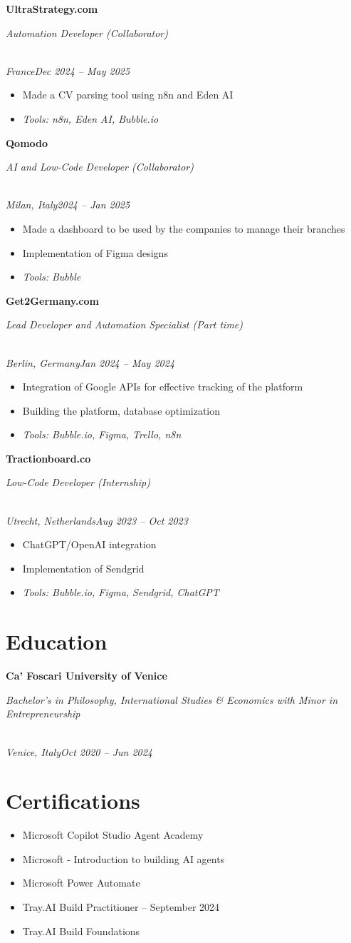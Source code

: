 \documentclass[a4paper,10pt]{article}
\newcommand{\role}[4]{\vspace{3pt}\noindent\hspace{0.6em}\parbox[t]{0.38\textwidth}{\raggedright\textbf{#1}}\hfill\parbox[t]{0.58\textwidth}{\raggedleft\textit{#2}}\\{\textit{#3}\hfill\textit{#4}}\vspace{1pt}}
\begin{document}
\role{UltraStrategy.com}{Automation Developer (Collaborator)}{France}{Dec 2024 -- May 2025}
\begin{itemize}
\item Made a CV parsing tool using n8n and Eden AI
\item \textit{Tools: n8n, Eden AI, Bubble.io}
\end{itemize}

\role{Qomodo}{AI and Low-Code Developer (Collaborator)}{Milan, Italy}{2024 -- Jan 2025}
\begin{itemize}
\item Made a dashboard to be used by the companies to manage their branches
\item Implementation of Figma designs
\item \textit{Tools: Bubble}
\end{itemize}

\role{Get2Germany.com}{Lead Developer and Automation Specialist (Part time)}{Berlin, Germany}{Jan 2024 -- May 2024}
\begin{itemize}
\item Integration of Google APIs for effective tracking of the platform
\item Building the platform, database optimization
\item \textit{Tools: Bubble.io, Figma, Trello, n8n}
\end{itemize}

\role{Tractionboard.co}{Low-Code Developer (Internship)}{Utrecht, Netherlands}{Aug 2023 -- Oct 2023}
\begin{itemize}
\item ChatGPT/OpenAI integration
\item Implementation of Sendgrid
\item \textit{Tools: Bubble.io, Figma, Sendgrid, ChatGPT}
\end{itemize}

\section{Education}
\role{Ca' Foscari University of Venice}{Bachelor's in Philosophy, International Studies \& Economics with Minor in Entrepreneurship}{Venice, Italy}{Oct 2020 -- Jun 2024}

\section{Certifications}
\begin{itemize}
\item Microsoft Copilot Studio Agent Academy
\item Microsoft - Introduction to building AI agents
\item Microsoft Power Automate
\item Tray.AI Build Practitioner -- September 2024
\item Tray.AI Build Foundations
\end{itemize}
\end{document}
